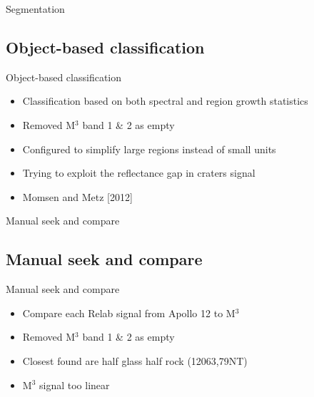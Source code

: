 \documentclass[unknownkeysallowed,xcolor=dvipsnames,beamer]{beamer} %
\begin{document}
\begin{frame}[fragile]{Segmentation}
\subsection{Object-based classification}
\begin{block}{Object-based classification}
\begin{itemize}
\item Classification based on both spectral and region growth statistics
\item Removed M$^3$ band 1 \& 2 as empty
\item Configured to simplify large regions instead of small units
\item Trying to exploit the reflectance gap in craters signal
\item Momsen and Metz [2012]
\end{itemize}
\end{block}
\end{frame}

\begin{frame}[fragile]{Manual seek and compare}
\subsection{Manual seek and compare}
\begin{block}{Manual seek and compare}
\begin{itemize}
\item Compare each Relab signal from Apollo 12 to M$^3$
\item Removed M$^3$ band 1 \& 2 as empty
\item Closest found are half glass half rock (12063,79NT)
\item M$^3$ signal too linear
\end{itemize}
\end{block}
\end{frame}
\end{document}
